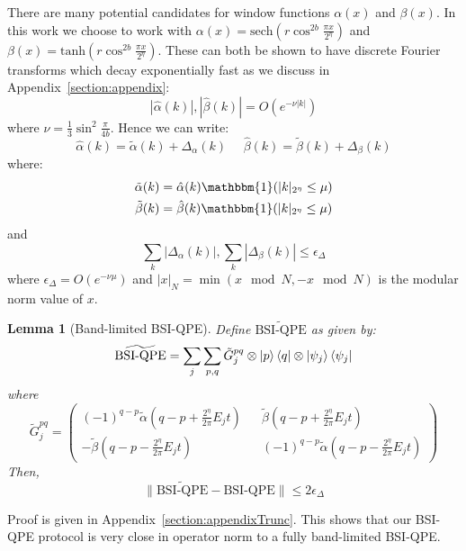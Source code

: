 \documentclass[aps,floatfix,10pt,amssymb,amsfont,amsmath,superscriptaddress,float,nofootinbib,longbibliography,nobalancelastpage,twocolumn]{revtex4-2}
\newtheorem{lemma}{Lemma}
\begin{document}
There are many potential candidates for window functions $\alpha(x)$ and $\beta(x)$. In this work we choose to work with $\alpha(x) = \text{sech}( r\cos^{2b} \frac{\pi x}{2^{\eta}})$ and $\beta(x) = \text{tanh}(r \cos^{2b} \frac{\pi x}{2^{\eta}})$. These can both be shown to have discrete Fourier transforms which decay exponentially fast as we discuss in Appendix~\ref{section:appendix}:
\begin{equation}
    |\hat \alpha(k)|,|\hat \beta(k)| = O\left( e^{-\nu |k|}\right)
    \label{eq:scaling}
\end{equation}
where $\nu = \frac{1}{3}\sin^2\frac{\pi}{4b}$. Hence we can write:
\begin{equation}
    \hat\alpha(k) = \tilde\alpha(k) + \Delta_{\alpha}(k) \>\>\>\>\>\>\hat\beta(k) = \tilde\beta(k) + \Delta_{\beta}(k)
    \label{eq:decomposealpha}
\end{equation}
where:
\begin{align}
    \tilde\alpha(k) &= \hat\alpha(k)\mathbbm{1}(|k|_{2^{\eta}}\leq \mu)\\
    \tilde\beta(k) &= \hat\beta(k)\mathbbm{1}(|k|_{2^{\eta}}\leq \mu)
    \label{eq:decomposealpha2}
\end{align}  and
\begin{equation}
    \sum_k|\Delta_\alpha(k)|,\sum_k|\Delta_\beta(k)|\leq \epsilon_{\Delta}
    \label{eq:decomposealpha3}
\end{equation} where $\epsilon_{\Delta} = O(e^{-\nu \mu})$ and $|x|_N = \min(x \mod N,- x\mod N)$ is the modular norm value of $x$.

\begin{lemma}[Band-limited BSI-QPE]
\label{lemma:0}
    Define $\widetilde{\text{BSI-QPE}}$ as given by:
    \begin{equation}
       \widetilde{\text{BSI-QPE}}= \sum_j \sum_{p,q} \tilde G^{pq}_j \otimes \ket{p}\bra{q} \otimes \ket{\psi_j}\bra{\psi_j}
    \end{equation}
    where 
    \begin{equation}
        \tilde G^{pq}_j = \left(\begin{smallmatrix}
        (-1)^{q-p}\tilde\alpha(q-p+\frac{2^{\eta}}{2\pi}E_jt) && \tilde\beta(q-p+\frac{2^{\eta}}{2\pi}E_jt)\\
        -\tilde\beta (q-p-\frac{2^{\eta}}{2\pi}E_jt) && (-1)^{q-p}\tilde\alpha(q-p-\frac{2^{\eta}}{2\pi}E_jt)
    \end{smallmatrix}\right)
    \end{equation}
    Then,  
    \begin{equation}
        \|\widetilde{\text{BSI-QPE}}-\text{BSI-QPE}\| \leq 2\epsilon_{\Delta}
    \end{equation}
\end{lemma}
Proof is given in Appendix~\ref{section:appendixTrunc}. This shows that our BSI-QPE protocol is very close in operator norm to a fully band-limited BSI-QPE.
\end{document}
